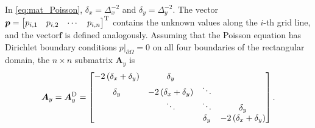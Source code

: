 \documentclass[preprint]{elsarticle}
\begin{document}
In \eqref{eq:mat_Poisson}, $\delta_x=\Delta_x^{-2}$ and $\delta_y=\Delta_y^{-2}$. The vector $\boldsymbol{p}=\left[\begin{matrix}p_{i,1}&p_{i,2}&\cdots&p_{i,n}\end{matrix}\right]^{\rm T}$ contains the unknown values along the $i$-th grid line, and the vector$\boldsymbol{f}$ is defined analogously. Assuming that the Poisson equation has Dirichlet boundary conditions $\left.p\right|_{\partial\Omega}=0$ on all four boundaries of the rectangular domain, the $n\times n$ submatrix $\boldsymbol{A}_y$ is
\begin{equation}
    \label{eq:submat_Dirichlet}
    \boldsymbol{A}_y=\boldsymbol{A}_y^{\rm D}=
    \left[\begin{matrix}
        -2\left(\delta_x+\delta_y\right) & \delta_y \\
        \delta_y & -2\left(\delta_x+\delta_y\right) & \ddots\\
        & \ddots & \ddots & \delta_y\\
        & & \delta_y & -2\left(\delta_x+\delta_y\right)
    \end{matrix}\right].
\end{equation}


\end{document}
